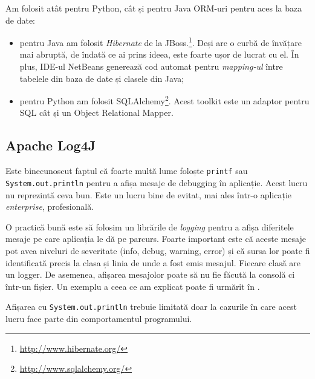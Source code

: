 Am folosit atât pentru Python, cât și pentru Java ORM-uri pentru aces la baza de date:
\begin{itemize}
\item pentru Java am folosit \textit{Hibernate} de la JBoss.\footnote{\url{http://www.hibernate.org/}}. Deși are o curbă de învățare mai abruptă, de îndată ce ai prins ideea, este foarte ușor de lucrat cu el. În plus, IDE-ul NetBeans generează cod automat pentru \textit{mapping-ul} între tabelele din baza de date și clasele din Java;

\item pentru Python am folosit SQLAlchemy\footnote{\url{http://www.sqlalchemy.org/}}. Acest toolkit este un adaptor pentru SQL cât și un Object Relational Mapper.

\end{itemize}


\subsection{Apache Log4J}

Este binecunoscut faptul că foarte multă lume foloște \texttt{printf} sau \texttt{System.out.println} pentru a afișa mesaje de debugging în aplicație. Acest lucru nu reprezintă ceva bun. Este un lucru bine de evitat, mai ales într-o aplicație \textit{enterprise}, profesională.

O practică bună este să folosim un librările de \textit{logging} pentru a afișa diferitele mesaje pe care aplicația le dă pe parcurs. Foarte important este că aceste mesaje pot avea niveluri de severitate (info, debug, warning, error) și că sursa lor poate fi identificată precis la clasa și linia de unde a fost emis mesajul. Fiecare clasă are un logger. De asemenea, afișarea mesajolor poate să nu fie făcută la consolă ci într-un fișier. Un exemplu a ceea ce am explicat poate fi urmărit în .


\lstset{language=make}
\lstset{caption=Exemplu de logging realizat de Apache Log4j,  label=lst:logging}


Afișarea cu \texttt{System.out.println} trebuie limitată doar la cazurile în care acest lucru face parte din comportamentul programului.






















